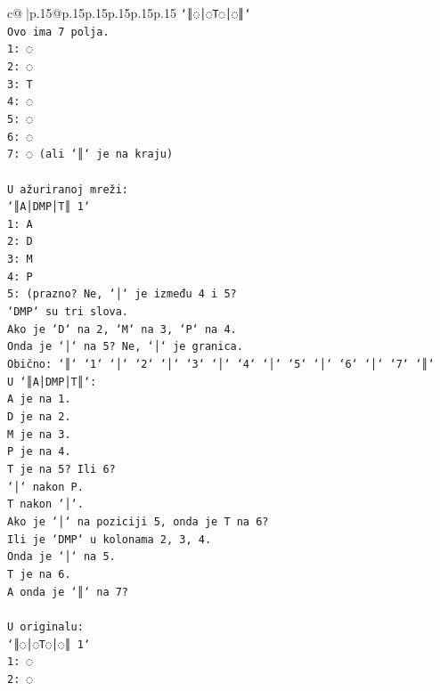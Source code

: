 \documentclass{article}
\begin{document}
{\begin{supertabular}{c@{$\;$}|p{.15\linewidth}@{}p{.15\linewidth}p{.15\linewidth}p{.15\linewidth}p{.15\linewidth}p{.15\linewidth}}
{{{\texttt{`║◌│◌T◌│◌║`} \\
\texttt{Ovo ima 7 polja.} \\
\texttt{1: ◌} \\
\texttt{2: ◌} \\
\texttt{3: T} \\
\texttt{4: ◌} \\
\texttt{5: ◌} \\
\texttt{6: ◌} \\
\texttt{7: ◌ (ali `║` je na kraju)} \\
\\ 
\texttt{U ažuriranoj mreži:} \\
\texttt{`║A│DMP│T║ 1`} \\
\texttt{1: A} \\
\texttt{2: D} \\
\texttt{3: M} \\
\texttt{4: P} \\
\texttt{5: (prazno? Ne, `│` je između 4 i 5?} \\
\texttt{`DMP` su tri slova.} \\
\texttt{Ako je `D` na 2, `M` na 3, `P` na 4.} \\
\texttt{Onda je `│` na 5? Ne, `│` je granica.} \\
\texttt{Obično: `║` `1` `│` `2` `│` `3` `│` `4` `│` `5` `│` `6` `│` `7` `║`} \\
\texttt{U `║A│DMP│T║`:} \\
\texttt{A je na 1.} \\
\texttt{D je na 2.} \\
\texttt{M je na 3.} \\
\texttt{P je na 4.} \\
\texttt{T je na 5? Ili 6?} \\
\texttt{`│` nakon P.} \\
\texttt{T nakon `│`.} \\
\texttt{Ako je `│` na poziciji 5, onda je T na 6?} \\
\texttt{Ili je `DMP` u kolonama 2, 3, 4.} \\
\texttt{Onda je `│` na 5.} \\
\texttt{T je na 6.} \\
\texttt{A onda je `║` na 7?} \\
\\ 
\texttt{U originalu:} \\
\texttt{`║◌│◌T◌│◌║ 1`} \\
\texttt{1: ◌} \\
\texttt{2: ◌} \\
}}}
\end{supertabular}}
\end{document}
